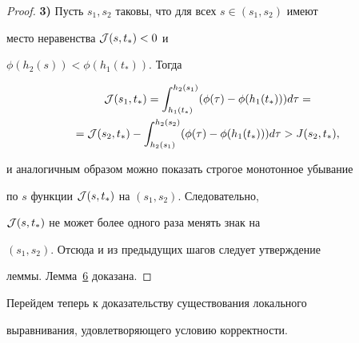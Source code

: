 \begin{proof}
{\bf 3)} Пусть $s_1,s_2$ таковы, что для всех $s\in(s_1,s_2)$ имеют

место неравенства ${\cal J}(s,t_*)<0$ и

$\phi(h_2(s))<\phi(h_1(t_*))$. Тогда

\begin{multline}

{\cal

J}(s_1,t_*)=\int _{h_1(t_*)}^{h_2(s_1)}(\phi(\tau)-\phi(h_1(t_*)))d\tau=

\\

={\cal

J}(s_2,t_*)-\int _{h_2(s_1)}^{h_2(s_2)}(\phi(\tau)-\phi(h_1(t_*)))d\tau>J(s_2,t_*),

\end{multline}

и аналогичным образом можно показать строгое монотонное убывание

по $s$ функции ${\cal J}(s,t_*)$ на $(s_1,s_2)$. Следовательно,

${\cal J}(s,t_*)$ не может более одного раза менять знак на

$(s_1,s_2)$. Отсюда и из предыдущих шагов следует утверждение

леммы. Лемма~\hyperlink{palin:lemma6}{6} доказана. \hfill \end{proof}



\smallskip



Перейдем теперь к доказательству существования локального

выравнивания, удовлетворяющего условию корректности.



\smallskip



\hypertarget{palin:lemma7}{}



